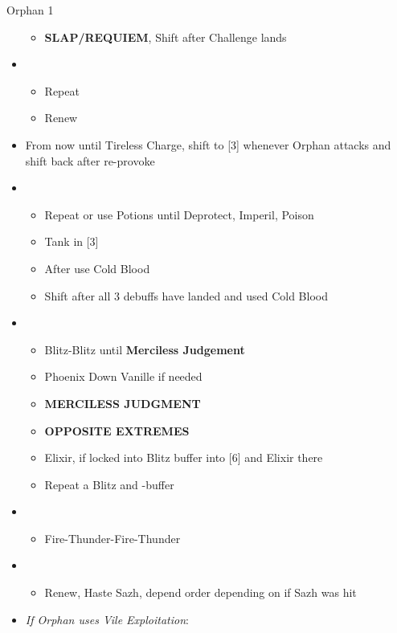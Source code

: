 \begin{battle}[2:55]{Orphan 1}
\begin{itemize}
			      \begin{itemize}
				      \item \textbf{SLAP/REQUIEM}, Shift after Challenge lands
			      \end{itemize}
			\item \fifth
			      \begin{itemize}
				      \item Repeat
				      \item Renew
			      \end{itemize}
			\item From now until Tireless Charge, shift to [3] whenever Orphan attacks and shift back after re-provoke
			\item \fifth
			      \begin{itemize}
				      \item Repeat or use Potions until Deprotect, Imperil, Poison
				      \item Tank in [3]
				      \item After \stagger use Cold Blood
				      \item Shift after all 3 debuffs have landed and used Cold Blood
			      \end{itemize}
			\item \first
			      \begin{itemize}
				      \item Blitz-Blitz until \textbf{Merciless Judgement}
				      \item Phoenix Down Vanille if needed
				      \item \textbf{MERCILESS JUDGMENT}
				      \item \textbf{OPPOSITE EXTREMES}
				      \item Elixir, if locked into Blitz buffer into [6] and Elixir there
				      \item Repeat a Blitz and \rav-buffer
			      \end{itemize}
			\item \sixth
			      \begin{itemize}
				      \item Fire-Thunder-Fire-Thunder
			      \end{itemize}
			\item \fourth
			      \begin{itemize}
				      \item Renew, Haste Sazh, depend order depending on if Sazh was hit
			      \end{itemize}
			\item \textit{If Orphan uses Vile Exploitation}:

\end{itemize}
\end{battle}
